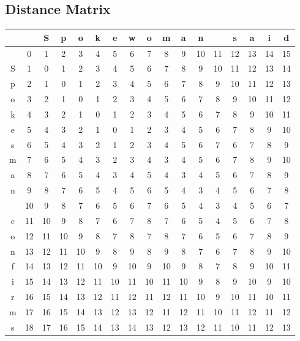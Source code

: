 \subsection{Distance Matrix}
\begin{tabular}{||c|c c c c c c c c c c c c c c c c |}
\hline
  &       &S  	&p	  &o	  &k	  &e	  &w	  &o	  &m	  &a	  &n	 &	   &s	  &a	  &i	  &d\\
\hline
\hline
  &   0 	&1	  &2	  &3	  &4	  &5	  &6 	  &7	  &8	  &9	  &10	  &11	  &12	  &13	  &14	  &15\\
S & 	1	  &0	  &1	  &2	  &3	  &4	  &5	  &6	  &7	  &8	  &9	  &10	  &11	  &12	  &13	  &14\\
p & 	2	  &1	  &0	  &1	  &2	  &3	  &4	  &5  	&6	  &7	  &8	  &9	  &10	  &11	  &12	  &13\\
o & 	3	  &2	  &1	  &0	  &1	  &2	  &3	  &4	  &5	  &6	  &7	  &8	  &9	  &10	  &11	  &12\\
k & 	4	  &3	  &2	  &1	  &0	  &1	  &2	  &3	  &4	  &5	  &6	  &7	  &8	  &9	  &10	  &11\\
e & 	5	  &4	  &3	  &2	  &1	  &0	  &1	  &2	  &3	  &4	  &5	  &6	  &7	  &8	  &9    &10\\
s & 	6	  &5	  &4	  &3	  &2	  &1	  &2	  &3	  &4	  &5	  &6	  &7	  &6	  &7	  &8    &9\\
m & 	7	  &6	  &5	  &4	  &3	  &2	  &3	  &4	  &3	  &4	  &5	  &6	  &7	  &8	  &9	  &10\\
a & 	8	  &7	  &6	  &5	  &4	  &3	  &4	  &5	  &4	  &3	  &4	  &5	  &6	  &7	  &8	  &9\\
n & 	9	  &8	  &7	  &6	  &5	  &4	  &5	  &6	  &5	  &4	  &3	  &4	  &5	  &6	  &7	  &8\\
  &   10	&9	  &8	  &7	  &6	  &5	  &6	  &7	  &6	  &5	  &4	  &3	  &4	  &5	  &6	  &7\\
c & 	11	&10	  &9	  &8	  &7	  &6	  &7	  &8	  &7	  &6	  &5	  &4	  &5	  &6	  &7	  &8\\
o & 	12	&11	  &10	  &9	  &8	  &7	  &8	  &7	  &8	  &7	  &6	  &5	  &6	  &7	  &8	  &9\\
n & 	13	&12	  &11	  &10	  &9	  &8	  &9	  &8	  &9	  &8	  &7	  &6	  &7	  &8	  &9	  &10\\
f & 	14	&13	  &12	  &11	  &10	  &9	  &10	  &9	  &10	  &9	  &8	  &7	  &8	  &9	  &10	  &11\\
i & 	15	&14	  &13	  &12	  &11	  &10	  &11	  &10	  &11	  &10	  &9	  &8	  &9	  &10	  &9	  &10\\
r & 	16	&15	  &14	  &13	  &12	  &11	  &12	  &11	  &12	  &11	  &10	  &9	  &10	  &11	  &10	  &11\\
m & 	17	&16	  &15	  &14	  &13	  &12	  &13	  &12	  &11	  &12	  &11	  &10	  &11	  &12	  &11	  &12\\
s & 	18	&17	  &16	  &15	  &14	  &13	  &14	  &13	  &12	  &13	  &12	  &11	  &10	  &11	  &12	  &13\\
  \hline
\end{tabular}


